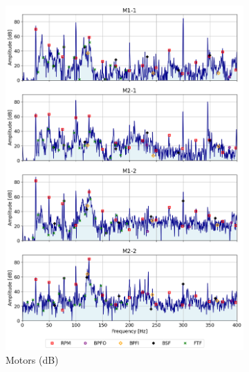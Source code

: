 \begin{figure}[h]
\begin{subfigure}[b]{0.24\textwidth}
        \includegraphics[width=\textwidth]{assets/results/defects/motors-dB.png}
        \caption{Motors (dB)}
    \end{subfigure}
    \begin{subfigure}[b]{0.24\textwidth}

\end{subfigure}
\end{figure}
